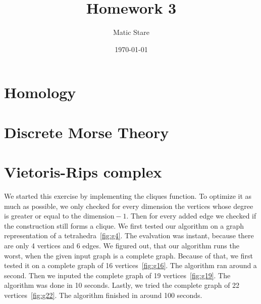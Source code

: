 \documentclass{article}
\title{Homework 3}
\author{Matic Stare}
\date{\today}
\begin{document}
\maketitle

\tableofcontents
\newpage

\section{Homology}\label{sec:p1}

\section{Discrete Morse Theory}\label{sec:p2}

\section{Vietoris-Rips complex}\label{sec:p3}

We started this exercise by implementing the cliques function. To optimize it as much as possible, we only checked for every dimension the vertices whose degree is greater or equal to the $\text{dimension} - 1$. Then for every added edge we checked if the construction still forms a clique. We first tested our algorithm on a graph representation of a tetrahedra~\ref{fig:g4}. The evalvation was instant, because there are only 4 vertices and 6 edges. We figured out, that our algorithm runs the worst, when the given input graph is a complete graph. Because of that, we first tested it on a complete graph of 16 vertices~\ref{fig:g16}. The algorithm ran around a second. Then we inputed the complete graph of 19 vertices~\ref{fig:g19}. The algorithm was done in 10 seconds. Lastly, we tried the complete graph of 22 vertices~\ref{fig:g22}. The algorithm finished in around 100 seconds.
\end{document}
